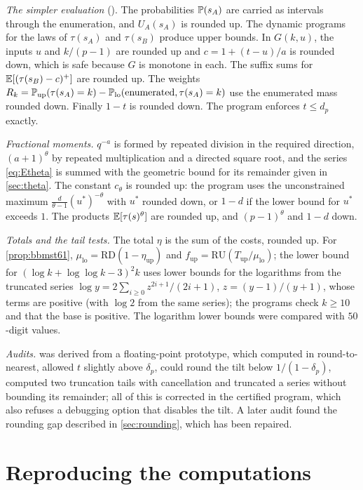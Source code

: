 \emph{The simpler evaluation} (). The probabilities $\P(s_A)$ are carried as intervals through the
enumeration, and $U_A(s_A)$ is rounded up. The dynamic programs for the laws of $\tau(s_A)$ and $\tau(s_B)$ produce
upper bounds. In $G(k,u)$, the inputs $u$ and $k/(p-1)$ are rounded up and $c=1+(t-u)/a$ is rounded down, which is
safe because $G$ is monotone in each. The suffix sums for $\E[(\tau(s_B)-c)^+]$ are rounded up. The weights
$R_k=\P_{\mathrm{up}}(\tau(s_A)=k)-\P_{\mathrm{lo}}(\text{enumerated},\tau(s_A)=k)$ use the enumerated mass rounded
down. Finally $1-t$ is rounded down. The program enforces $t\le d_p$ exactly.

\emph{Fractional moments.} $q^{-a}$ is formed by repeated division in the required direction, $(a+1)^\theta$ by
repeated multiplication and a directed square root, and the series \eqref{eq:Etheta} is summed with the geometric
bound for its remainder given in \cref{sec:theta}. The constant $c_\theta$ is rounded up: the program uses the
unconstrained maximum $\frac{d}{\theta-1}(u^*)^{-\theta}$ with $u^*$ rounded down, or $1-d$ if the lower bound for $u^*$
exceeds $1$. The products $\E[\tau(s)^\theta]$ are rounded up, and $(p-1)^\theta$ and $1-d$ down.

\emph{Totals and the tail tests.} The total $\eta$ is the sum of the costs, rounded up. For
\cref{prop:bbmst61}, $\mu_{\mathrm{lo}}=\mathrm{RD}(1-\eta_{\mathrm{up}})$ and
$f_{\mathrm{up}}=\mathrm{RU}(T_{\mathrm{up}}/\mu_{\mathrm{lo}})$; the lower bound for $(\log k+\log\log k-3)^2k$ uses lower
bounds for the logarithms from the truncated series $\log y=2\sum_{i\ge0}z^{2i+1}/(2i+1)$, $z=(y-1)/(y+1)$, whose
terms are positive (with $\log2$ from the same series); the programs check $k\ge10$ and that the base is positive.
The logarithm lower bounds were compared with $50$-digit values.

\emph{Audits.}  was derived from a floating-point prototype, which computed in round-to-nearest,
allowed $t$ slightly above $\delta_p$, could round the tilt below $1/(1-\delta_p)$, computed two truncation tails with
cancellation and truncated a series without bounding its remainder; all of this is corrected in the certified program,
which also refuses a debugging option that disables the tilt. A later audit found the rounding gap described in
\cref{sec:rounding}, which has been repaired.

\section{Reproducing the computations}\label{app:reproduce}

